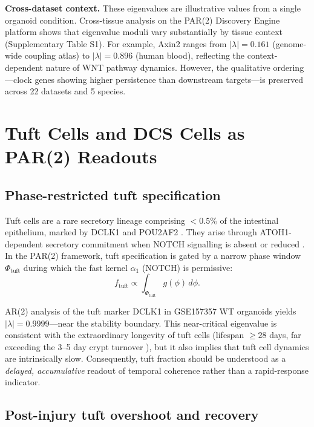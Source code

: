 \documentclass[11pt,letterpaper]{article}
\theoremstyle{definition}
\theoremstyle{remark}
\begin{document}
\textbf{Cross-dataset context.} These eigenvalues are illustrative values from a single organoid condition. Cross-tissue analysis on the PAR(2) Discovery Engine platform shows that eigenvalue moduli vary substantially by tissue context (Supplementary Table S1). For example, Axin2 ranges from $|\lambda| = 0.161$ (genome-wide coupling atlas) to $|\lambda| = 0.896$ (human blood), reflecting the context-dependent nature of WNT pathway dynamics. However, the qualitative ordering---clock genes showing higher persistence than downstream targets---is preserved across 22 datasets and 5 species.

\section{Tuft Cells and DCS Cells as PAR(2) Readouts}
\label{sec:tuft}

\subsection{Phase-restricted tuft specification}

Tuft cells are a rare secretory lineage comprising $<0.5\%$ of the intestinal epithelium, marked by DCLK1 and POU2AF2 \citep{nguyen2025colonic}. They arise through ATOH1-dependent secretory commitment when NOTCH signalling is absent or reduced \citep{vanderflier2009notch}. In the PAR(2) framework, tuft specification is gated by a narrow phase window $\Phi_{\mathrm{tuft}}$ during which the fast kernel $\alpha_1$ (NOTCH) is permissive:
\begin{equation}
f_{\mathrm{tuft}} \propto \int_{\Phi_{\mathrm{tuft}}} g(\phi) \, d\phi.
\end{equation}

AR(2) analysis of the tuft marker DCLK1 in GSE157357 WT organoids yields $|\lambda| = 0.9999$---near the stability boundary. This near-critical eigenvalue is consistent with the extraordinary longevity of tuft cells (lifespan $\geq 28$ days, far exceeding the 3--5 day crypt turnover \citep{nguyen2025colonic}), but it also implies that tuft cell dynamics are intrinsically slow. Consequently, tuft fraction should be understood as a \textit{delayed, accumulative} readout of temporal coherence rather than a rapid-response indicator.

\subsection{Post-injury tuft overshoot and recovery}
\end{document}
